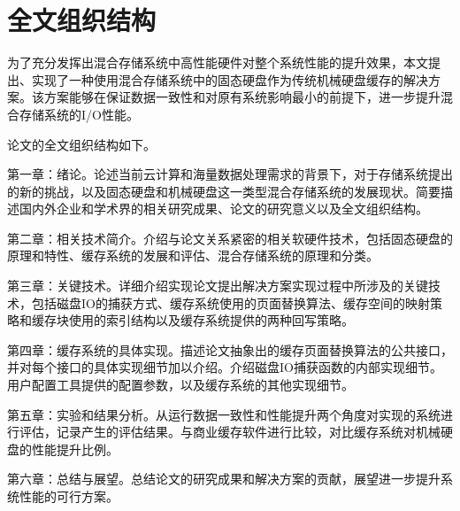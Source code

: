 \section{全文组织结构}
\label{sec:organization}

为了充分发挥出混合存储系统中高性能硬件对整个系统性能的提升效果，本文提出、实现了一种使用混合存储系统中的固态硬盘作为传统机械硬盘缓存的解决方案。该方案能够在保证数据一致性和对原有系统影响最小的前提下，进一步提升混合存储系统的I/O性能。

论文的全文组织结构如下。

第一章：绪论。论述当前云计算和海量数据处理需求的背景下，对于存储系统提出的新的挑战，以及固态硬盘和机械硬盘这一类型混合存储系统的发展现状。简要描述国内外企业和学术界的相关研究成果、论文的研究意义以及全文组织结构。

第二章：相关技术简介。介绍与论文关系紧密的相关软硬件技术，包括固态硬盘的原理和特性、缓存系统的发展和评估、混合存储系统的原理和分类。

第三章：关键技术。详细介绍实现论文提出解决方案实现过程中所涉及的关键技术，包括磁盘IO的捕获方式、缓存系统使用的页面替换算法、缓存空间的映射策略和缓存块使用的索引结构以及缓存系统提供的两种回写策略。

第四章：缓存系统的具体实现。描述论文抽象出的缓存页面替换算法的公共接口，并对每个接口的具体实现细节加以介绍。介绍磁盘IO捕获函数的内部实现细节。用户配置工具提供的配置参数，以及缓存系统的其他实现细节。

第五章：实验和结果分析。从运行数据一致性和性能提升两个角度对实现的系统进行评估，记录产生的评估结果。与商业缓存软件进行比较，对比缓存系统对机械硬盘的性能提升比例。

第六章：总结与展望。总结论文的研究成果和解决方案的贡献，展望进一步提升系统性能的可行方案。

